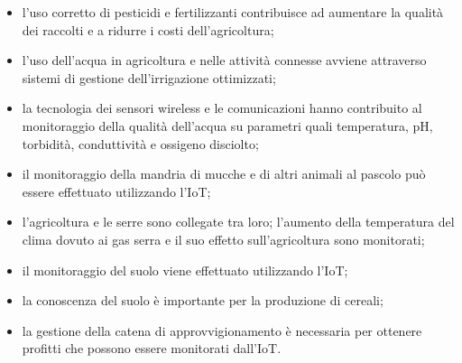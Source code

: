 \begin{itemize}
    \item l'uso corretto di pesticidi e fertilizzanti contribuisce ad aumentare la qualità dei raccolti e a ridurre i costi dell'agricoltura;
    \item l'uso dell'acqua in agricoltura e nelle attività connesse avviene attraverso sistemi di gestione dell'irrigazione ottimizzati;
    \item la tecnologia dei sensori wireless e le comunicazioni hanno contribuito al monitoraggio della qualità dell'acqua su parametri quali temperatura, pH, torbidità, conduttività e ossigeno disciolto;
    \item il monitoraggio della mandria di mucche e di altri animali al pascolo può essere effettuato utilizzando l'IoT;
    \item l'agricoltura e le serre sono collegate tra loro; l'aumento della temperatura del clima dovuto ai gas serra e il suo effetto sull'agricoltura sono monitorati;
    \item il monitoraggio del suolo viene effettuato utilizzando l'IoT;
    \item la conoscenza del suolo è importante per la produzione di cereali;    
    \item la gestione della catena di approvvigionamento è necessaria per ottenere profitti che possono essere monitorati dall'IoT.
\end{itemize}